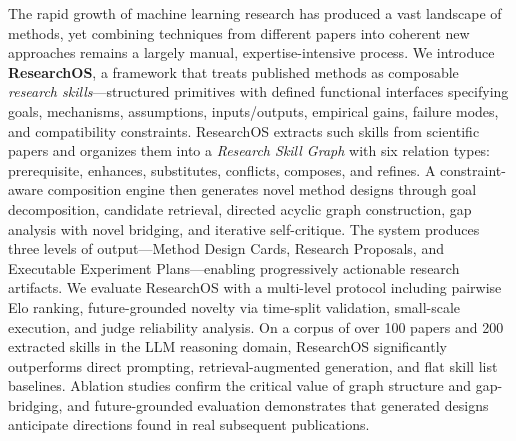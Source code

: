 The rapid growth of machine learning research has produced a vast landscape of
methods, yet combining techniques from different papers into coherent new
approaches remains a largely manual, expertise-intensive process. We introduce
\textbf{ResearchOS}, a framework that treats published methods as composable
\emph{research skills}---structured primitives with defined functional
interfaces specifying goals, mechanisms, assumptions, inputs/outputs, empirical
gains, failure modes, and compatibility constraints. ResearchOS extracts such
skills from scientific papers and organizes them into a \emph{Research Skill
Graph} with six relation types: prerequisite, enhances, substitutes, conflicts,
composes, and refines. A constraint-aware composition engine then generates
novel method designs through goal decomposition, candidate retrieval, directed
acyclic graph construction, gap analysis with novel bridging, and iterative
self-critique. The system produces three levels of output---Method Design
Cards, Research Proposals, and Executable Experiment Plans---enabling
progressively actionable research artifacts. We evaluate ResearchOS with a
multi-level protocol including pairwise Elo ranking, future-grounded novelty
via time-split validation, small-scale execution, and judge reliability
analysis. On a corpus of over 100 papers and 200 extracted skills in the LLM
reasoning domain, ResearchOS significantly outperforms direct prompting, retrieval-augmented generation, and flat skill list baselines. Ablation studies
confirm the critical value of graph structure and gap-bridging, and
future-grounded evaluation demonstrates that generated designs anticipate
directions found in real subsequent publications.
